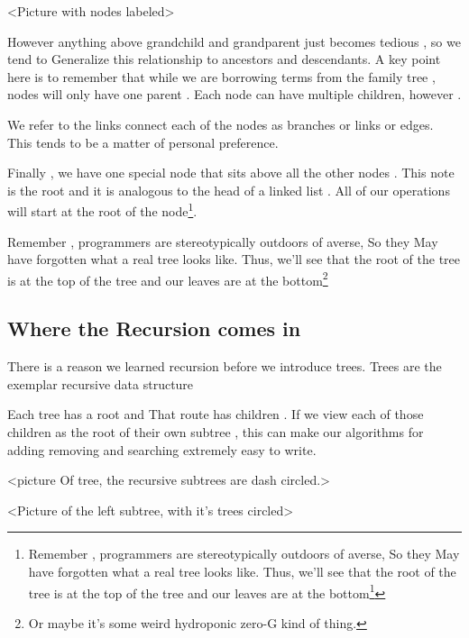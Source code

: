 \documentclass[10pt,a4paper]{book}
\begin{document}
<Picture with nodes labeled>


However anything above grandchild and grandparent just becomes tedious , so we tend to  Generalize this relationship to ancestors and descendants.  A key point here is to remember that while we are borrowing terms from the family tree , nodes will only have one parent . Each node can have multiple children, however .


We refer to the links connect each of the nodes as branches or links or edges.  This tends to be a matter of personal preference.



Finally , we have one special node that sits above all the other nodes . This note is the root and it is analogous to the head of a linked list . All of our operations will start at the root of the node\footnote{Remember , programmers are stereotypically outdoors of averse, So they May have forgotten what a real tree looks like.  Thus, we'll see that the root of the tree is at the top of the tree and our leaves are at the bottom\footnote{Or maybe it's some weird hydroponic zero-G kind of thing.}}.


Remember , programmers are stereotypically outdoors of averse, So they May have forgotten what a real tree looks like.  Thus, we'll see that the root of the tree is at the top of the tree and our leaves are at the bottom\footnote{Or maybe it's some weird hydroponic zero-G kind of thing.}


\subsection{Where the  Recursion comes in}
There is a reason we learned recursion before we introduce trees. Trees are the exemplar recursive data structure

Each tree has a root and That route has children .  If we view each of those children as the root of their own subtree , this can make our algorithms for adding removing and searching extremely easy to write.

<picture Of tree, the recursive subtrees are dash circled.>

<Picture of the left subtree, with it's trees circled>
\end{document}
